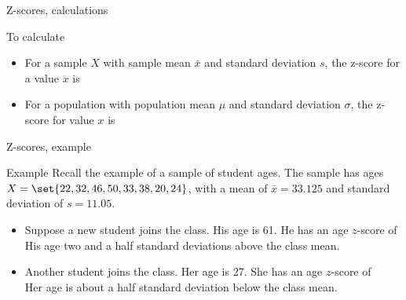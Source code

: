 \documentclass[xcolor=table, aspectratio=169, bigger, handout]{beamer}
\begin{document}
\begin{frame}{Z-scores, calculations}
\begin{block}{To calculate}
\begin{itemize}
\item For a sample $X$ with sample mean $\bar x$ and standard deviation $s$, the z-score for a value $x$ is\\ \smallskip
{}
\smallskip
\pause
\item For a population with population mean $\mu$ and standard deviation $\sigma$, the z-score for value $x$ is\\ \smallskip
{}
\end{itemize} 
\end{block}
\end{frame}

\begin{frame}{Z-scores, example}
\begin{exampleblock}{Example}
Recall the example of a sample of student ages. The sample has ages $X = \set{22, 32, 46, 50, 33, 38, 20, 24}$, with a mean of $\bar x = 33.125$ and standard deviation of $s=11.05$.
\begin{itemize}
\pause
\item Suppose a new student joins the class. His age is 61. He has an age $z$-score of\\ \smallskip
{}
\medskip
\pause
His age two and a half standard deviations above the class mean.
\smallskip
\pause
\item Another student joins the class. Her age is 27. She has an age $z$-score of\\
\smallskip
{}
\medskip
\pause
Her age is about a half standard deviation below the class mean.
\end{itemize}

\end{exampleblock}
\end{frame}
\end{document}
